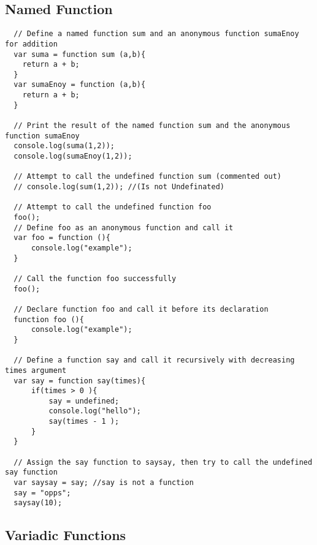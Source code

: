 \documentclass[12pt,a4paper, twosite]{article}
\begin{document}
\subsection{Named Function}
\begin{verbatim}
  // Define a named function sum and an anonymous function sumaEnoy for addition
  var suma = function sum (a,b){
    return a + b;
  }
  var sumaEnoy = function (a,b){
    return a + b;
  }

  // Print the result of the named function sum and the anonymous function sumaEnoy
  console.log(suma(1,2));
  console.log(sumaEnoy(1,2));

  // Attempt to call the undefined function sum (commented out)
  // console.log(sum(1,2)); //(Is not Undefinated)

  // Attempt to call the undefined function foo
  foo();
  // Define foo as an anonymous function and call it
  var foo = function (){
      console.log("example");
  }

  // Call the function foo successfully
  foo();

  // Declare function foo and call it before its declaration
  function foo (){
      console.log("example");
  }

  // Define a function say and call it recursively with decreasing times argument
  var say = function say(times){
      if(times > 0 ){
          say = undefined;
          console.log("hello");
          say(times - 1 );
      }
  }

  // Assign the say function to saysay, then try to call the undefined say function
  var saysay = say; //say is not a function
  say = "opps";
  saysay(10);
\end{verbatim}

\newpage

\subsection{Variadic Functions}
\end{document}
